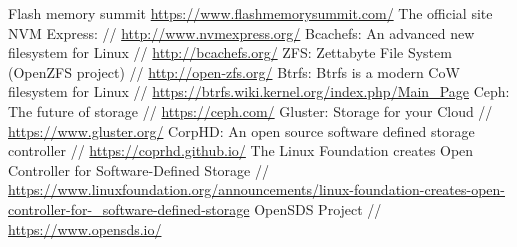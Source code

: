 \documentclass[10pt, a5paper]{article}
\begin{document}
\begin{thebibliography}{20}
Flash memory summit \url{https://www.flashmemorysummit.com/}
The official site NVM Express: // \url{http://www.nvmexpress.org/}
Bcachefs: An advanced new filesystem for Linux // \url{http://bcachefs.org/}
ZFS: Zettabyte File System (OpenZFS project) //  \url{http://open-zfs.org/}
Btrfs: Btrfs is a modern CoW filesystem for Linux // \url{https://btrfs.wiki.kernel.org/index.php/Main_Page}
Ceph: The future of storage // \url{https://ceph.com/}
Gluster: Storage for your Cloud // \url{https://www.gluster.org/}
CorpHD: An open source software defined storage controller // \url{https://coprhd.github.io/}
The Linux Foundation creates Open Controller for Software-Defined Storage // \url{https://www.linuxfoundation.org/announcements/linux-foundation-creates-open-controller-for-_software-defined-storage}
OpenSDS Project // \url{https://www.opensds.io/}
\end{thebibliography}
\end{document}
